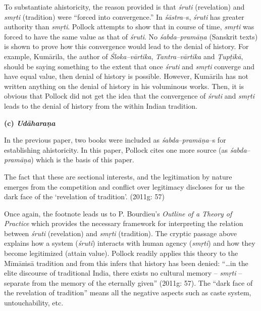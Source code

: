 To substantiate ahistoricity, the reason provided is that \textit{śruti} (revelation) and \textit{smṛti} (tradition) were “forced into convergence.” In \textit{śāstra}–s, \textit{śruti} has greater authority than \textit{smṛti}. Pollock attempts to show that in course of time, \textit{smṛti }was forced to have the same value as that of\textit{ śruti}. No \textit{śabda}–\textit{pramāṇa} (Sanskrit texts) is shown to prove how this convergence would lead to the denial of history. For example, Kumārila, the author of \textit{Śloka–vārtika}, \textit{Tantra–vārtika} and \textit{Ṭupṭīkā}, should be saying something to the extent that once \textit{śruti} and \textit{smṛti} converge and have equal value, then denial of history is possible. However, Kumārila has not written anything on the denial of history in his voluminous works. Then, it is obvious that Pollock did not get the idea that the convergence of \textit{śruti} and \textit{smṛti} leads to the denial of history from the within Indian tradition.

\newpage

\textbf{(c) \textit{Udāharaṇa}}

In the previous paper, two books were included as\textit{ śabda}–\textit{pramāṇa}–s for establishing ahistoricity. In this paper, Pollock cites one more source (as \textit{śabda}–\textit{pramāṇa}) which is the basis of this paper.

\begin{myquote}
The fact that these are sectional interests, and the legitimation by nature emerges from the competition and conflict over legitimacy discloses for us the dark face of the ‘revelation of tradition’. (2011g: 57)
\end{myquote}

Once again, the footnote leads us to P. Bourdieu’s \textit{Outline of a Theory of Practice} which provides the necessary framework for interpreting the relation between \textit{śruti }(revelation) and \textit{smṛti} (tradition). The cryptic passage above explains how a system (\textit{śruti}) interacts with human agency (\textit{smṛti}) and how they become legitimized (attain value). Pollock readily applies this theory to the Mīmāṁsā tradition and from this infers that history has been denied: “…in the elite discourse of traditional India, there exists no cultural memory –\textit{ smṛti }– separate from the memory of the eternally given” (2011g: 57). The “dark face of the revelation of tradition” means all the negative aspects such as caste system, untouchability, etc.

